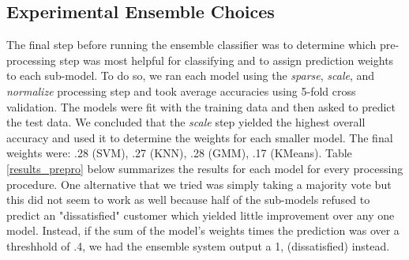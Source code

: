 \documentclass[11pt]{article}
\begin{document}
\subsection{Experimental Ensemble Choices}
The final step before running the ensemble classifier was to determine which 
pre-processing step was most helpful for classifying and to assign prediction 
weights to each sub-model. To do so, we ran each model using the 
\textit{sparse}, \textit{scale}, and \textit{normalize} processing step and 
took average accuracies using 5-fold cross validation. The models were fit with the training data and then asked to predict the test data. We concluded that 
the \textit{scale} step yielded the highest overall accuracy and used it to 
determine the weights for each smaller model. The final weights were: 
.28 (SVM), .27 (KNN), .28 (GMM), .17 (KMeans). Table \ref{results_prepro} 
below summarizes the results for each model for every processing procedure. 
One alternative that we tried was simply taking a majority vote but this did 
not seem to work as well because half of the sub-models refused to predict 
an "dissatisfied" customer which yielded little improvement over any one 
model. Instead, if the sum of the model's weights times the prediction was 
over a threshhold of .4, we had the ensemble system output a 1, 
(dissatisfied) instead.
\end{document}
